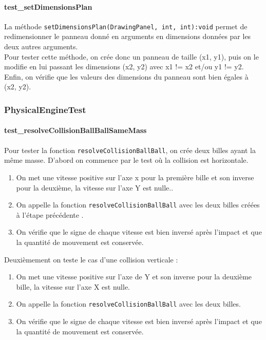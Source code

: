 \documentclass{report}
\begin{document}
\paragraph{test\_setDimensionsPlan}

La méthode \texttt{setDimensionsPlan(DrawingPanel, int, int):void} permet de redimensionner le panneau donné en arguments en dimensions données par les deux autres arguments. \\

Pour tester cette méthode, on crée donc un panneau de taille (x1, y1), puis on le modifie en lui passant les dimensions (x2, y2) avec x1 != x2 et/ou y1 != y2. Enfin, on vérifie que les valeurs des dimensions du panneau sont bien égales à (x2, y2).

\newpage
\subsubsection{PhysicalEngineTest}

\paragraph{test\_resolveCollisionBallBallSameMass}

Pour tester la fonction \texttt{resolveCollisionBallBall}, on crée deux billes ayant la même masse.
D’abord on commence par le test où la collision est horizontale. 

\begin{enumerate}
\item On met une vitesse positive sur l’axe x pour la première bille et son inverse pour la deuxième, la vitesse sur l’axe Y est nulle..
\item On appelle la fonction \texttt{resolveCollisionBallBall} avec les deux billes créées à l’étape précédente .
\item On vérifie que le signe de chaque vitesse est bien inversé après l’impact et que la quantité de mouvement est conservée.\\
\end{enumerate}

Deuxièmement on teste le cas d’une collision verticale :

\begin{enumerate}
\item On met une vitesse positive sur l’axe de Y et son inverse pour la deuxième bille, la vitesse sur l’axe X est nulle.
\item On appelle la fonction \texttt{resolveCollisionBallBall} avec les deux billes.
\item On vérifie que le signe de chaque vitesse est bien inversé après l’impact et que la quantité de mouvement est conservée.\\
\end{enumerate}
\end{document}
